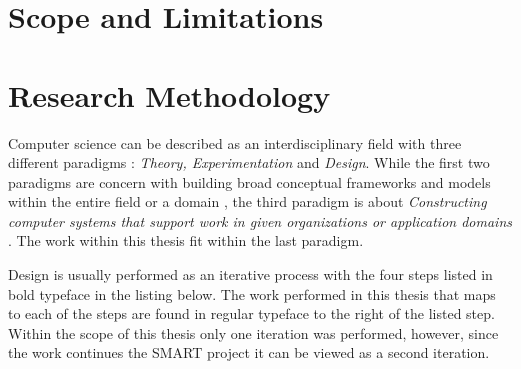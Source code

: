 \section{Scope and Limitations}

\section{Research Methodology}
Computer science can be described as an interdisciplinary field with three different paradigms \cite{01-Denning-computer_science,01-Denning-computing_as_a_dicipline}:
\textit{Theory, Experimentation} and \textit{Design}. While the first two paradigms are concern with building broad conceptual frameworks and models within the entire field or a domain \cite{01-Denning-computer_science}, the third paradigm is about \textit{Constructing computer systems that support work in given organizations or application domains} \cite{01-Denning-computer_science}. The work within this thesis fit within the last paradigm.

Design is usually performed as an iterative process with the four steps \cite{01-Denning-computing_as_a_dicipline} listed in bold typeface in the listing below. The work performed in this thesis that maps to each of the steps are found in regular typeface to the right of the listed step. Within the scope of this thesis only one iteration was performed, however, since the work continues the SMART project it can be viewed as a second iteration. 

